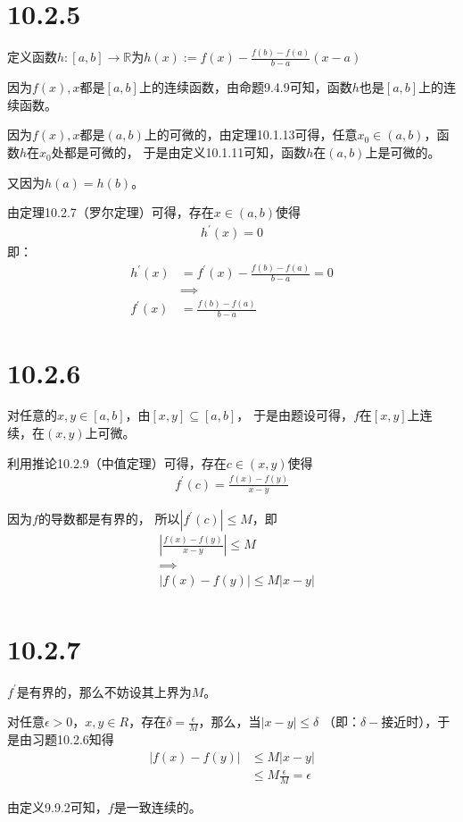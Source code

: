 \documentclass{article}
\begin{document}
\section*{10.2.5}

定义函数$h: [a, b] \to \mathbb{R}$为$h(x) := f(x) - \frac{f(b)-f(a)}{b-a}(x - a)$

因为$f(x), x$都是$[a, b]$上的连续函数，由命题9.4.9可知，函数$h$也是$[a, b]$上的连续函数。


因为$f(x), x$都是$(a, b)$上的可微的，由定理10.1.13可得，任意$x_0 \in (a, b)$，函数$h$在$x_0$处都是可微的，
于是由定义10.1.11可知，函数$h$在$(a, b)$上是可微的。

又因为$h(a) = h(b)$。

由定理10.2.7（罗尔定理）可得，存在$x \in (a, b)$使得
\begin{align*}
  h^\prime(x) = 0
\end{align*}
即：
\begin{align*}
  h^\prime(x) & = f^\prime(x) - \frac{f(b)-f(a)}{b-a} = 0 \\
              & \implies                                  \\
  f^\prime(x) & = \frac{f(b)-f(a)}{b-a}
\end{align*}

\section*{10.2.6}

对任意的$x, y \in [a, b]$，由$[x, y] \subseteq [a, b]$，
于是由题设可得，$f$在$[x, y]$上连续，在$(x, y)$上可微。

利用推论10.2.9（中值定理）可得，存在$c \in (x, y)$使得
\begin{align*}
  f^\prime(c) = \frac{f(x) - f(y)}{x - y}
\end{align*}

因为$f$的导数都是有界的，
所以$|f^\prime(c)| \leq M$，即
\begin{align*}
   & \left|\frac{f(x) - f(y)}{x - y}\right| \leq M \\
   & \implies                                      \\
   & |f(x) - f(y)| \leq M|x - y|                   \\
\end{align*}

\section*{10.2.7}

$f^\prime$是有界的，那么不妨设其上界为$M$。

对任意$\epsilon > 0$，$x, y \in R$，存在$\delta = \frac{\epsilon}{M}$，那么，当$|x - y| \leq \delta$
（即：$\delta-$接近时），于是由习题10.2.6知得
\begin{align*}
  |f(x) - f(y)| & \leq M|x - y|         \\
                & \leq M\frac{\epsilon}{M} = \epsilon
\end{align*}

由定义9.9.2可知，$f$是一致连续的。
\end{document}
